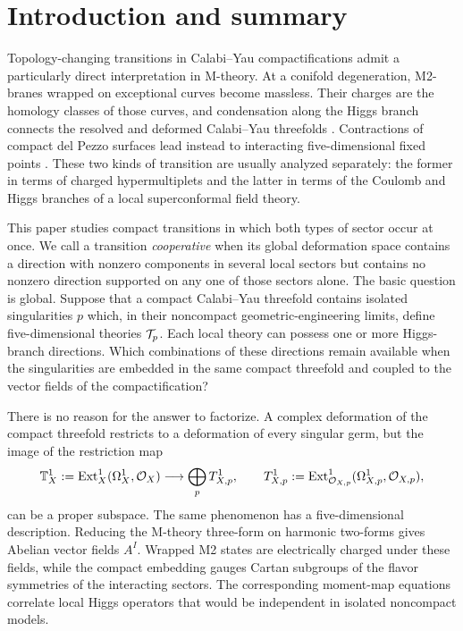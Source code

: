 \section{Introduction and summary}
\label{sec:introduction}

Topology-changing transitions in Calabi--Yau compactifications admit a
particularly direct interpretation in M-theory. At a conifold degeneration,
M2-branes wrapped on exceptional curves become massless. Their charges are the
homology classes of those curves, and condensation along the Higgs branch
connects the resolved and deformed Calabi--Yau threefolds
\cite{Greene:1995hu,Katz:1996,Witten:1996qb,Mohaupt:2004de}. Contractions of
compact del Pezzo surfaces lead instead to interacting five-dimensional fixed
points \cite{Seiberg:1996,Morrison:1996pp,Douglas:1996,Intriligator:1997}. These two kinds of transition are usually analyzed
separately: the former in terms of charged hypermultiplets and the latter in
terms of the Coulomb and Higgs branches of a local superconformal field theory.

This paper studies compact transitions in which both types of sector occur at
once. We call a transition \emph{cooperative} when its global deformation
space contains a direction with nonzero components in several local sectors
but contains no nonzero direction supported on any one of those sectors
alone. The basic question is global. Suppose that a compact Calabi--Yau
threefold contains isolated singularities $p$ which, in their noncompact
geometric-engineering limits, define five-dimensional theories $\mathcal T_p$. Each
local theory can possess one or more Higgs-branch directions. Which
combinations of these directions remain available when the singularities are
embedded in the same compact threefold and coupled to the vector fields of the
compactification?

There is no reason for the answer to factorize. A complex deformation of the
compact threefold restricts to a deformation of every singular germ, but the
image of the restriction map
\begin{equation}
  \mathbb T^1_X:=\operatorname{Ext}^1_X(\Omega_X^1,\mathcal O_X)
  \longrightarrow \bigoplus_p T^1_{X,p},
  \qquad
  T^1_{X,p}:=\operatorname{Ext}^1_{\mathcal O_{X,p}}
  (\Omega^1_{X,p},\mathcal O_{X,p}),
  \label{eq:intro-restriction}
\end{equation}
can be a proper subspace. The same phenomenon has a five-dimensional
description. Reducing the M-theory three-form on harmonic two-forms gives
Abelian vector fields $A^I$. Wrapped M2 states are electrically charged under
these fields, while the compact embedding gauges Cartan subgroups of the
flavor symmetries of the interacting sectors. The corresponding moment-map
equations correlate local Higgs operators that would be independent in
isolated noncompact models.

